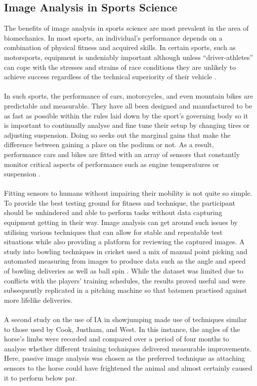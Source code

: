 \subsection{Image Analysis in Sports Science}
	The benefits of image analysis in sports science are most prevalent in the area of biomechanics. In most sports, an individual’s performance depends on a combination of physical fitness and acquired skills. In certain sports, such as motorsports, equipment is undeniably important although unless “driver-athletes” can cope with the stresses and strains of race conditions they are unlikely to achieve success regardless of the technical superiority of their vehicle \citep{klarica2001performance}.
	\\\\
	In such sports, the performance of cars, motorcycles, and even mountain bikes are predictable and measurable. They have all been designed and manufactured to be as fast as possible within the rules laid down by the sport’s governing body so it is important to continually analyse and fine tune their setup by changing tires or adjusting suspension. Doing so seeks out the marginal gains that make the difference between gaining a place on the podium or not. As a result, performance cars and bikes are fitted with an array of sensors that constantly monitor critical aspects of performance such as engine temperatures or suspension \citep{segers2008analysis}. 
	\\\\
	Fitting sensors to humans without impairing their mobility is not quite so simple. To provide the best testing ground for fitness and technique, the participant should be unhindered and able to perform tasks without data capturing equipment getting in their way. Image analysis can get around such issues by utilising various techniques that can allow for stable and repeatable test situations while also providing a platform for reviewing the captured images. A study into bowling techniques in cricket used a mix of manual point picking and automated measuring from images to produce data such as the angle and speed of bowling deliveries as well as ball spin \citep{cricketimaging}. While the dataset was limited due to conflicts with the players’ training schedules, the results proved useful and were subsequently replicated in a pitching machine so that batsmen practised against more lifelike deliveries.
	\\\\
	A second study on the use of IA in showjumping \citep{jumpyhorses} made use of techniques similar to those used by Cook, Justham, and West. In this instance, the angles of the horse’s limbs were recorded and compared over a period of four months to analyse whether different training techniques delivered measurable improvements. Here, passive image analysis was chosen as the preferred technique as attaching sensors to the horse could have frightened the animal and almost certainly caused it to perform below par.